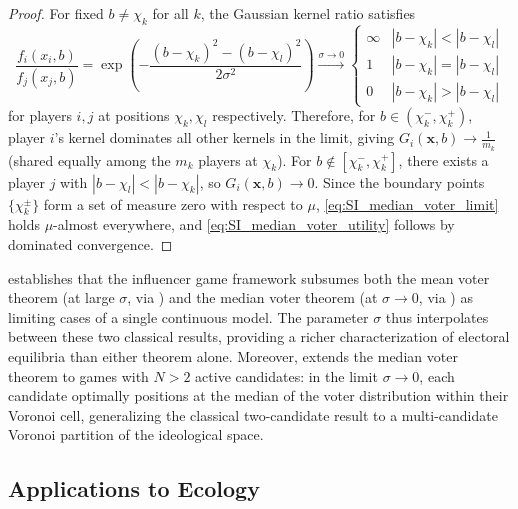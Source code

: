 \documentclass{article}
\begin{document}
        \begin{proof}
            For fixed $b \neq \chi_k$ for all $k$, the Gaussian kernel ratio satisfies
            \begin{equation}
                \frac{f_i(x_i, b)}{f_j(x_j, b)}
                = \exp\!\left(-\frac{(b-\chi_k)^2 - (b-\chi_l)^2}{2\sigma^2}\right)
                \xrightarrow{\sigma \to 0}
                \begin{cases}
                    \infty & |b - \chi_k| < |b - \chi_l| \\
                    1 & |b-\chi_k| = |b-\chi_l| \\
                    0 & |b-\chi_k| > |b-\chi_l|
                \end{cases}
            \end{equation}
            for players $i,j$ at positions $\chi_k, \chi_l$ respectively.
            Therefore, for $b \in (\chi_k^-, \chi_k^+)$, player $i$'s kernel dominates all other kernels in the limit, giving $G_i(\mathbf{x},b) \to \frac{1}{m_k}$ (shared equally among the $m_k$ players at $\chi_k$).
            For $b \notin [\chi_k^-, \chi_k^+]$, there exists a player $j$ with $|b - \chi_l| < |b - \chi_k|$, so $G_i(\mathbf{x},b) \to 0$.
            Since the boundary points $\{\chi_k^\pm\}$ form a set of measure zero with respect to $\mu$, \cref{eq:SI_median_voter_limit} holds $\mu$-almost everywhere, and \cref{eq:SI_median_voter_utility} follows by dominated convergence.
        \end{proof}

         establishes that the influencer game framework subsumes both the mean voter theorem (at large $\sigma$, via ) and the median voter theorem (at $\sigma \to 0$, via ) as limiting cases of a single continuous model.
        The parameter $\sigma$ thus interpolates between these two classical results, providing a richer characterization of electoral equilibria than either theorem alone.
        Moreover,  extends the median voter theorem to games with $N > 2$ active candidates: in the limit $\sigma \to 0$, each candidate optimally positions at the median of the voter distribution within their Voronoi cell, generalizing the classical two-candidate result to a multi-candidate Voronoi partition of the ideological space.


        \subsection{Applications to Ecology}\label{subsec:SI_ecology}
\end{document}
